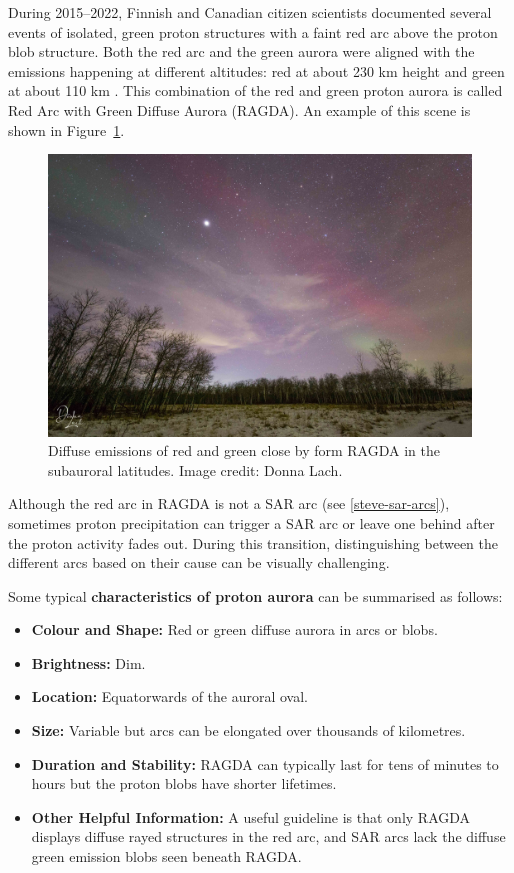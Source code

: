 \documentclass{article}
\renewcommand{\cite}[1]{\parencite{#1}}
\begin{document}
During 2015--2022, Finnish and Canadian citizen scientists documented several events of isolated, green proton structures with a faint red arc above the proton blob structure. Both the red arc and the green aurora were aligned with the emissions happening at different altitudes: red at about 230 km height and green at about 110 km \cite{Nishimura2022}. This combination of the red and green proton aurora is called Red Arc with Green Diffuse Aurora (RAGDA). An example of this scene is shown in Figure~\ref{fig-ragdaexample}.


\begin{figure}[h!]
  \includegraphics[width=0.9\linewidth]{Fig11_RAGDA_DonnaLach.jpg}
  \caption{Diffuse emissions of red and green close by form RAGDA in the subauroral latitudes. Image credit: Donna Lach.}
  \label{fig-ragdaexample}
\end{figure}

Although the red arc in RAGDA is not a SAR arc (see \ref{steve-sar-arcs}), sometimes proton precipitation can trigger a SAR arc or leave one behind after the proton activity fades out. During this transition, distinguishing between the different arcs based on their cause can be visually challenging. 

Some typical {\bf characteristics of proton aurora} can be summarised as follows:
\begin{itemize}
    \item \textbf{Colour and Shape:} Red or green diffuse aurora in arcs or blobs.
    \item \textbf{Brightness:} Dim.
    \item \textbf{Location:} Equatorwards of the auroral oval.
    \item \textbf{Size:} Variable but arcs can be elongated over thousands of kilometres.
    \item \textbf{Duration and Stability:} RAGDA can typically last for tens of minutes to hours but the proton blobs have shorter lifetimes.
    \item \textbf{Other Helpful Information:} A useful guideline is that only RAGDA displays diffuse rayed structures in the red arc, and SAR arcs lack the diffuse green emission blobs seen beneath RAGDA.  
    \end{itemize}
\end{document}
